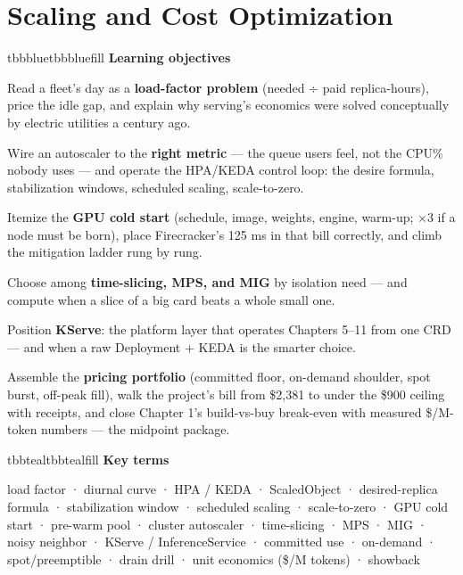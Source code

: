 \setcounter{chapter}{11}
\chapter{Scaling and Cost Optimization}

\begin{calloutbox}{tbbblue}{tbbbluefill}
{\normalsize\bfseries\color{tbbblue}Learning objectives}\par\vspace{3pt}
\begin{tbbitemize}
  \item Read a fleet's day as a \textbf{load-factor problem} (needed ÷ paid replica-hours), price the idle gap, and explain why serving's economics were solved conceptually by electric utilities a century ago.
  \item Wire an autoscaler to the \textbf{right metric} — the queue users feel, not the CPU\% nobody uses — and operate the HPA/KEDA control loop: the desire formula, stabilization windows, scheduled scaling, scale-to-zero.
  \item Itemize the \textbf{GPU cold start} (schedule, image, weights, engine, warm-up; ×3 if a node must be born), place Firecracker's 125 ms in that bill correctly, and climb the mitigation ladder rung by rung.
  \item Choose among \textbf{time-slicing, MPS, and MIG} by isolation need — and compute when a slice of a big card beats a whole small one.
  \item Position \textbf{KServe}: the platform layer that operates Chapters 5–11 from one CRD — and when a raw Deployment + KEDA is the smarter choice.
  \item Assemble the \textbf{pricing portfolio} (committed floor, on-demand shoulder, spot burst, off-peak fill), walk the project's bill from \$2,381 to under the \$900 ceiling with receipts, and close Chapter 1's build-vs-buy break-even with measured \$/M-token numbers — the midpoint package.
\end{tbbitemize}
\end{calloutbox}

\vspace{2.5pt}

\begin{calloutbox}{tbbteal}{tbbtealfill}
{\normalsize\bfseries\color{tbbteal}Key terms}\par\vspace{3pt}
load factor · diurnal curve · HPA / KEDA · ScaledObject · desired-replica formula · stabilization window · scheduled scaling · scale-to-zero · GPU cold start · pre-warm pool · cluster autoscaler · time-slicing · MPS · MIG · noisy neighbor · KServe / InferenceService · committed use · on-demand · spot/preemptible · drain drill · unit economics (\$/M tokens) · showback
\end{calloutbox}

